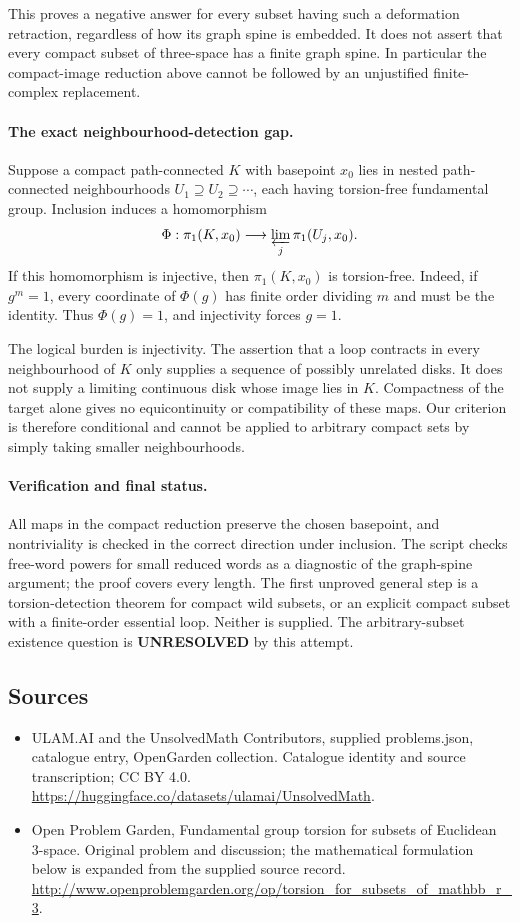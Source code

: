 \documentclass[11pt,a4paper]{article}
\begin{document}
This proves a negative answer for every subset having such a deformation retraction, regardless of how its graph spine is embedded. It does not assert that every compact subset of three-space has a finite graph spine. In particular the compact-image reduction above cannot be followed by an unjustified finite-complex replacement.

\paragraph{The exact neighbourhood-detection gap.}
Suppose a compact path-connected $K$ with basepoint $x_0$ lies in nested path-connected neighbourhoods $U_1\supseteq U_2\supseteq\cdots$, each having torsion-free fundamental group. Inclusion induces a homomorphism
\[
 \Phi:\pi_1(K,x_0)\longrightarrow
 \varprojlim_j\pi_1(U_j,x_0).
\]
If this homomorphism is injective, then $\pi_1(K,x_0)$ is torsion-free. Indeed, if $g^m=1$, every coordinate of $\Phi(g)$ has finite order dividing $m$ and must be the identity. Thus $\Phi(g)=1$, and injectivity forces $g=1$.

The logical burden is injectivity. The assertion that a loop contracts in every neighbourhood of $K$ only supplies a sequence of possibly unrelated disks. It does not supply a limiting continuous disk whose image lies in $K$. Compactness of the target alone gives no equicontinuity or compatibility of these maps. Our criterion is therefore conditional and cannot be applied to arbitrary compact sets by simply taking smaller neighbourhoods.

\paragraph{Verification and final status.}
All maps in the compact reduction preserve the chosen basepoint, and nontriviality is checked in the correct direction under inclusion. The script checks free-word powers for small reduced words as a diagnostic of the graph-spine argument; the proof covers every length. The first unproved general step is a torsion-detection theorem for compact wild subsets, or an explicit compact subset with a finite-order essential loop. Neither is supplied. The arbitrary-subset existence question is \textbf{UNRESOLVED} by this attempt.

\subsection{Sources}
\begin{itemize}
\item[S1] ULAM.AI and the UnsolvedMath Contributors, supplied problems.json, catalogue entry, OpenGarden collection. Catalogue identity and source transcription; CC BY 4.0.
\url{https://huggingface.co/datasets/ulamai/UnsolvedMath}.
\item[S2] Open Problem Garden, Fundamental group torsion for subsets of Euclidean 3-space. Original problem and discussion; the mathematical formulation below is expanded from the supplied source record.
\url{http://www.openproblemgarden.org/op/torsion_for_subsets_of_mathbb_r_3}.

\end{itemize}
\end{document}
